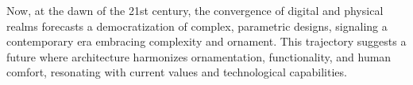 Now, at the dawn of the 21st century, the convergence of digital and physical realms forecasts a democratization of complex, parametric designs, signaling a contemporary era embracing complexity and ornament\cite{Schwab2016}.
This trajectory suggests a future where architecture harmonizes ornamentation, functionality, and human comfort, resonating with current values and technological capabilities.


%
%
%
%
